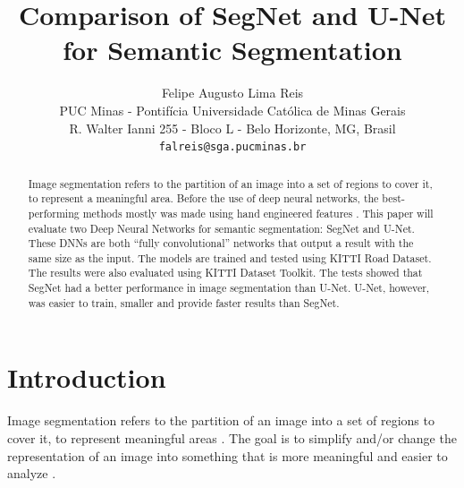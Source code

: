 \documentclass[10pt,twocolumn,letterpaper]{article}
\begin{document}
\title{Comparison of SegNet and U-Net for Semantic Segmentation}

\author{Felipe Augusto Lima Reis\\
PUC Minas - Pontif\'icia Universidade Cat\'olica de Minas Gerais\\
R. Walter Ianni 255 - Bloco L - Belo Horizonte, MG, Brasil\\
{\tt\small falreis@sga.pucminas.br}
}

\maketitle


\begin{abstract}
    Image segmentation refers to the partition of an image into a set of regions to cover it, to represent a meaningful area. Before the use of deep neural networks, the best-performing methods mostly was made using hand engineered features \cite{SEGNET}. This paper will evaluate two Deep Neural Networks for semantic segmentation: SegNet and U-Net. These DNNs are both ``fully convolutional'' networks that output a result with the same size as the input. The models are trained and tested using KITTI Road Dataset. The results were also evaluated using KITTI Dataset Toolkit. The tests showed that SegNet had a better performance in image segmentation than U-Net. U-Net, however, was easier to train, smaller and provide faster results than SegNet.
\end{abstract}



\section{Introduction} \label{introduction}

Image segmentation refers to the partition of an image into a set of regions to cover it, to represent meaningful areas \cite{DOMINGUEZ}. The goal is to simplify and/or change the representation of an image into something that is more meaningful and easier to analyze \cite{AHMED_SARMA}.
\end{document}
